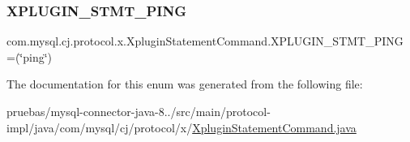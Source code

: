 \subsubsection{\texorpdfstring{X\+P\+L\+U\+G\+I\+N\+\_\+\+S\+T\+M\+T\+\_\+\+P\+I\+NG}{XPLUGIN\_STMT\_PING}}
{\footnotesize\ttfamily com.\+mysql.\+cj.\+protocol.\+x.\+Xplugin\+Statement\+Command.\+X\+P\+L\+U\+G\+I\+N\+\_\+\+S\+T\+M\+T\+\_\+\+P\+I\+NG =(\char`\"{}ping\char`\"{})}



The documentation for this enum was generated from the following file\+:\begin{DoxyCompactItemize}
\item 
pruebas/mysql-\/connector-\/java-\/8../src/main/protocol-\/impl/java/com/mysql/cj/protocol/x/\mbox{\hyperlink{_xplugin_statement_command_8java}{Xplugin\+Statement\+Command.\+java}}\end{DoxyCompactItemize}
